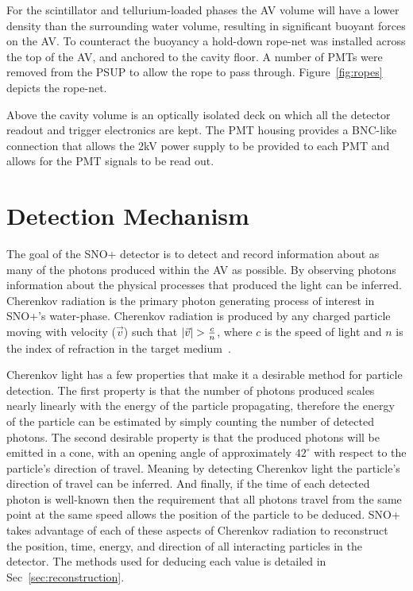 For the scintillator and tellurium-loaded phases the AV volume will have
a lower density than the surrounding water volume, resulting in significant buoyant
forces on the AV\@.
To counteract the buoyancy a hold-down rope-net was installed across the top
of the AV, and anchored to the cavity floor.
A number of PMTs were removed from the PSUP to allow the rope to pass through.
Figure~\ref{fig:ropes} depicts the rope-net.

Above the cavity volume is an optically isolated deck on which all the detector
readout and trigger electronics are kept.
The PMT housing provides a BNC-like connection that allows the 2kV power 
supply to be provided to each PMT and allows for the PMT signals to be read
out.

\section{Detection Mechanism}
The goal of the SNO+ detector is to detect and record information about as
many of the photons produced within the AV as possible.
By observing photons information about the physical processes that produced
the light can be inferred.
Cherenkov radiation is the primary photon generating process of interest in
SNO+'s water-phase.
Cherenkov radiation is produced by any charged particle moving with
velocity ($\vec{v}$) such that $\abs{\vec{v}} > \frac{c}{n}$, where $c$ is the speed
of light and $n$ is the index of refraction in the target medium~\citep{cherenkov}.

Cherenkov light has a few properties that make it a desirable
method for particle detection.
The first property is that the number of photons produced scales nearly linearly
with the energy of the particle propagating, therefore the energy of the particle
can be estimated by simply counting the number of detected photons.
The second desirable property is that the produced photons will be
emitted in a cone, with an opening angle of approximately $42^{\circ}$ with
respect to the particle's direction of travel.
Meaning by detecting Cherenkov light the particle's direction of travel
can be inferred.
And finally, if the time of each detected photon is well-known then
the requirement that all photons travel from the same point at the same speed
allows the position of the particle to be deduced.
SNO+ takes advantage of each of these aspects of Cherenkov radiation to reconstruct
the position, time, energy, and direction of all interacting particles in the
detector.
The methods used for deducing each value is detailed in Sec~\ref{sec:reconstruction}.

